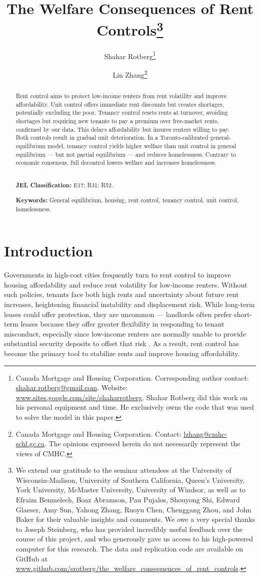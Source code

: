 \documentclass[parskip=full]{article}
\title{\vspace{-1.8cm}The Welfare Consequences of Rent Controls\footnote{We extend our gratitude to the seminar attendees at the University of Wisconsin-Madison, University of Southern California, Queen's University, York University, McMaster University, University of Windsor, as well as to Efraim Benmelech, Boaz Abramson, Pau Pujalos, Shouyong Shi, Edward Glaeser, Amy Sun, Yahong Zhang, Ruoyu Chen, Chenggang Zhou, and John Baker for their valuable insights and comments. We owe a very special thanks to Joseph Steinberg, who has provided incredibly useful feedback over the course of this project, and who generously gave us access to his high-powered computer for this research. The data and replication code are available on GitHub at \url{www.github.com/srotberg/the_welfare_consequences_of_rent_controls}.}}
\author{Shahar Rotberg\footnote{Canada Mortgage and Housing Corporation. Corresponding author contact: \url{shahar.rotberg@gmail.com}. Website: \url{www.sites.google.com/site/shaharrotberg}. Shahar Rotberg did this work on his personal equipment and time. He exclusively owns the code that was used to solve the model in this paper.} \and Lin Zhang\footnote{Canada Mortgage and Housing Corporation. Contact: \url{lzhang@cmhc-schl.gc.ca}. The opinions expressed herein do not necessarily represent the views of CMHC.}}
\begin{document}
\maketitle

\begin{abstract}
\onehalfspacing
\noindent Rent control aims to protect low-income renters from rent volatility and improve affordability. Unit control offers immediate rent discounts but creates shortages, potentially excluding the poor. Tenancy control resets rents at turnover, avoiding shortages but requiring new tenants to pay a premium over free-market rents, confirmed by our data. This delays affordability but insures renters willing to pay. Both controls result in gradual unit deterioration. In a Toronto-calibrated general-equilibrium model, tenancy control yields higher welfare than unit control in general equilibrium — but not partial equilibrium — and reduces homelessness. Contrary to economic consensus, full decontrol lowers welfare and increases homelessness.

\\[1.5ex]

\noindent \textbf{JEL Classification:} E17; R31; R52. 

\noindent \textbf{Keywords:} General equilibrium, housing, rent control, tenancy control, unit control, homelessness.
\end{abstract}

\section{Introduction}

Governments in high-cost cities frequently turn to rent control to improve housing affordability and reduce rent volatility for low-income renters. Without such policies, tenants face both high rents and uncertainty about future rent increases, heightening financial instability and displacement risk. While long-term leases could offer protection, they are uncommon — landlords often prefer short-term leases because they offer greater flexibility in responding to tenant misconduct, especially since low-income renters are normally unable to provide substantial security deposits to offset that risk \citep[pp. 26–27]{Merrill-2020}. As a result, rent control has become the primary tool to stabilize rents and improve housing affordability. 
\end{document}
